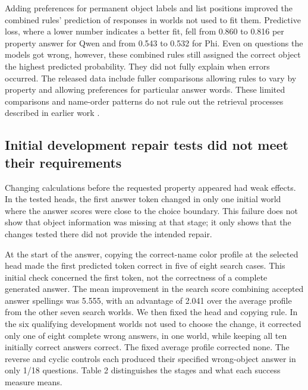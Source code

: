 \documentclass[10pt,letterpaper]{article}
\begin{document}
Adding preferences for permanent object labels and list positions improved the combined rules' prediction of responses in worlds not used to fit them. Predictive loss, where a lower number indicates a better fit, fell from 0.860 to 0.816 per property answer for Qwen and from 0.543 to 0.532 for Phi. Even on questions the models got wrong, however, these combined rules still assigned the correct object the highest predicted probability. They did not fully explain when errors occurred. The released data include fuller comparisons allowing rules to vary by property and allowing preferences for particular answer words. These limited comparisons and name-order patterns do not rule out the retrieval processes described in earlier work \cite{gurarieh2026mixing}.


\subsection*{Initial development repair tests did not meet their requirements}

Changing calculations before the requested property appeared had weak effects. In the tested heads, the first answer token changed in only one initial world where the answer scores were close to the choice boundary. This failure does not show that object information was missing at that stage; it only shows that the changes tested there did not provide the intended repair.


At the start of the answer, copying the correct-name color profile at the selected head made the first predicted token correct in five of eight search cases. This initial check concerned the first token, not the correctness of a complete generated answer. The mean improvement in the search score combining accepted answer spellings was 5.555, with an advantage of 2.041 over the average profile from the other seven search worlds. We then fixed the head and copying rule. In the six qualifying development worlds not used to choose the change, it corrected only one of eight complete wrong answers, in one world, while keeping all ten initially correct answers correct. The fixed average profile corrected none. The reverse and cyclic controls each produced their specified wrong-object answer in only 1/18 questions. Table 2 distinguishes the stages and what each success measure means.
\end{document}
